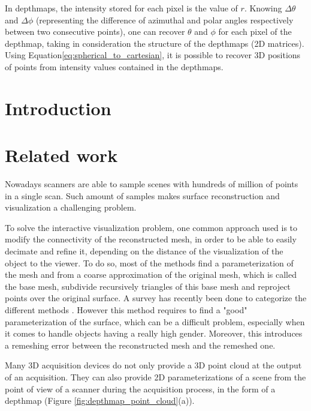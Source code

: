 \documentclass[11pt,fleqn]{book} %
\begin{document}
In depthmaps, the intensity stored for each pixel is the value of $r$. Knowing $\Delta\theta$ and $\Delta\phi$ (representing the difference of azimuthal and polar angles respectively between two consecutive points), one can recover $\theta$ and $\phi$ for each pixel of the depthmap, taking in consideration the structure of the depthmaps (2D matrices). 
Using Equation\eqref{eq:spherical_to_cartesian}, it is possible to recover 3D positions of points from intensity values contained in the depthmaps.

\section{Introduction}
\label{sec:introduction}

\section{Related work}
\label{sec:related_work}

Nowadays scanners are able to sample scenes with hundreds of million of points in a single scan. 
Such amount of samples makes surface reconstruction and visualization a challenging problem.

To solve the interactive visualization problem, one common approach used is to modify the connectivity of the reconstructed mesh, in order to be able to easily decimate and refine it, depending on the distance of the visualization of the object to the viewer.
To do so, most of the methods find a parameterization of the mesh and from a coarse approximation of the original mesh, which is called the base mesh, subdivide recursively triangles of this base mesh and reproject points over the original surface. 
A survey has recently been done to categorize the different methods \cite{PRS15}.
However this method requires to find a "good" parameterization of the surface, which can be a difficult problem, especially when it comes to handle objects having a really high gender.
Moreover, this introduces a remeshing error between the reconstructed mesh and the remeshed one.

Many 3D acquisition devices do not only provide a 3D point cloud at the output of an acquisition. 
They can also provide 2D parameterizations of a scene from the point of view of a scanner during the acquisition process, in the form of a depthmap (Figure \ref{fig:depthmap_point_cloud}(a)).
\end{document}
